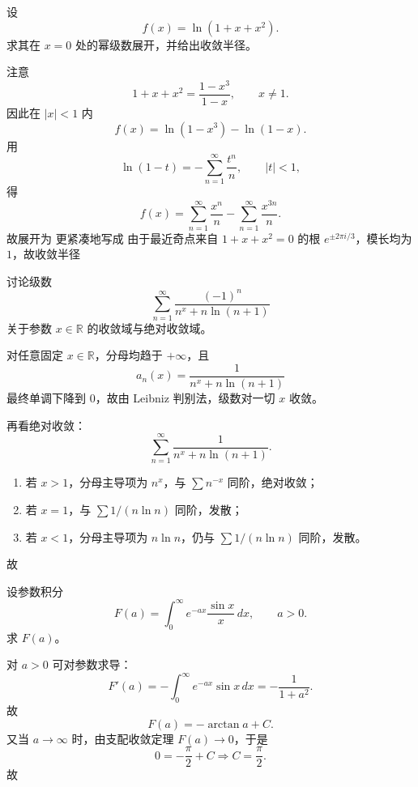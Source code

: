 \begin{question}
设
\[
 f(x)=\ln(1+x+x^2).
\]
求其在 $x=0$ 处的幂级数展开，并给出收敛半径。
\begin{solution}

注意
\[
1+x+x^2=\frac{1-x^3}{1-x},\qquad x\ne1.
\]
因此在 $|x|<1$ 内
\[
 f(x)=\ln(1-x^3)-\ln(1-x).
\]
用
\[
\ln(1-t)=-\sum_{n=1}^{\infty}\frac{t^n}{n},\qquad |t|<1,
\]
得
\[
 f(x)=\sum_{n=1}^{\infty}\frac{x^n}{n}-\sum_{n=1}^{\infty}\frac{x^{3n}}{n}.
\]
故展开为
更紧凑地写成
由于最近奇点来自 $1+x+x^2=0$ 的根 $e^{\pm 2\pi i/3}$，模长均为 $1$，故收敛半径
\end{solution}
\end{question}

\begin{question}
讨论级数
\[
\sum_{n=1}^{\infty}\frac{(-1)^n}{n^x+n\ln(n+1)}
\]
关于参数 $x\in\mathbb R$ 的收敛域与绝对收敛域。
\begin{solution}

对任意固定 $x\in\mathbb R$，分母均趋于 $+\infty$，且
\[
 a_n(x)=\frac{1}{n^x+n\ln(n+1)}
\]
最终单调下降到 $0$，故由 Leibniz 判别法，级数对一切 $x$ 收敛。

再看绝对收敛：
\[
\sum_{n=1}^{\infty}\frac{1}{n^x+n\ln(n+1)}.
\]
\begin{enumerate}[label=（\arabic*）,leftmargin=2.8em,itemsep=0.2em]
\item 若 $x>1$，分母主导项为 $n^x$，与 $\sum n^{-x}$ 同阶，绝对收敛；
\item 若 $x=1$，与 $\sum 1/(n\ln n)$ 同阶，发散；
\item 若 $x<1$，分母主导项为 $n\ln n$，仍与 $\sum 1/(n\ln n)$ 同阶，发散。
\end{enumerate}
故
\end{solution}
\end{question}

\begin{question}
设参数积分
\[
F(a)=\int_0^{\infty}e^{-ax}\frac{\sin x}{x}\,dx,\qquad a>0.
\]
求 $F(a)$。
\begin{solution}

对 $a>0$ 可对参数求导：
\[
F'(a)=-\int_0^{\infty}e^{-ax}\sin x\,dx=-\frac{1}{1+a^2}.
\]
故
\[
F(a)=-\arctan a+C.
\]
又当 $a\to\infty$ 时，由支配收敛定理 $F(a)\to0$，于是
\[
0=-\frac\pi2+C\Longrightarrow C=\frac\pi2.
\]
故
\end{solution}
\end{question}


